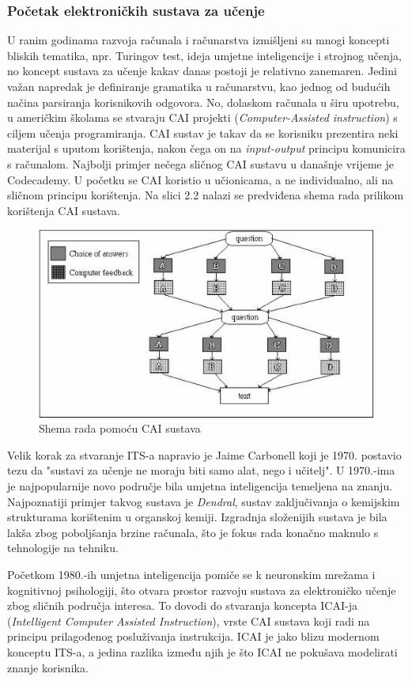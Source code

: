\documentclass[times, utf8, zavrsni, numeric]{fer}
\begin{document}
\subsubsection{Početak elektroničkih sustava za učenje}
U ranim godinama razvoja računala i računarstva izmišljeni su mnogi koncepti bliskih tematika, npr. Turingov test, ideja umjetne inteligencije i strojnog učenja, no koncept sustava za učenje kakav danas postoji je relativno zanemaren. Jedini važan napredak je definiranje gramatika u računarstvu, kao jednog od budućih načina parsiranja korisnikovih odgovora. No, dolaskom računala u širu upotrebu, u američkim školama se stvaraju CAI  projekti (\textit{Computer-Assisted instruction}) s ciljem učenja programiranja. CAI sustav je takav da se korisniku prezentira neki materijal s uputom korištenja, nakon čega on na \textit{input-output} principu komunicira s računalom. Najbolji primjer nečega sličnog CAI sustavu u današnje vrijeme je Codecademy. U početku se CAI koristio u učionicama, a ne individualno, ali na sličnom principu korištenja.\citep{markurban} Na slici 2.2 nalazi se predviđena shema rada prilikom korištenja CAI sustava.

\begin{figure}[htb]
	\centering
	\includegraphics[]{img/CAI_shema.jpg}
	\caption{Shema rada pomoću CAI sustava\citep{caipic}}
	\label{fig:cai}
\end{figure}

\par
Velik korak za stvaranje ITS-a napravio je Jaime Carbonell koji je 1970. postavio tezu da "sustavi za učenje ne moraju biti samo alat, nego i učitelj".\citep{peters} U 1970.-ima je najpopularnije novo područje bila umjetna inteligencija temeljena na znanju. Najpoznatiji primjer takvog sustava je \textit{Dendral}, sustav zaključivanja o kemijskim strukturama korištenim u organskoj kemiji. Izgradnja složenijih sustava je bila lakša zbog poboljšanja brzine računala, što je fokus rada konačno maknulo s tehnologije na tehniku. 
\par
Početkom 1980.-ih umjetna inteligencija pomiče se k neuronskim mrežama i kognitivnoj psihologiji, što otvara prostor razvoju sustava za elektroničko učenje zbog sličnih područja interesa. To dovodi do stvaranja koncepta ICAI-ja (\textit{Intelligent Computer Assisted Instruction}), vrste CAI sustava koji radi na principu prilagođenog posluživanja instrukcija. ICAI je jako blizu modernom konceptu ITS-a, a jedina razlika između njih je što ICAI ne pokušava modelirati znanje korisnika.\citep{markurban}
\end{document}

